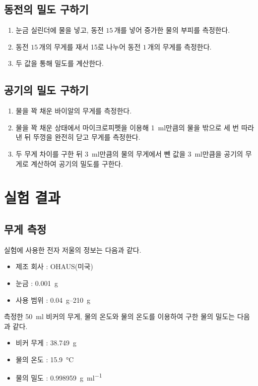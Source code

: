 \documentclass{GSHS-chemexp}
\begin{document}
	\subsection{동전의 밀도 구하기}
	\begin{enumerate}
		\item 눈금 실린더에 물을 넣고, 동전 $15\,\mbox{개}$를 넣어
		증가한 물의 부피를 측정한다.
		\item 동전 $15\,\mbox{개}$의 무게를 재서 15로 나누어
		동전 $1\,\mbox{개}$의 무게를 측정한다.
		\item 두 값을 통해 밀도를 계산한다.
	\end{enumerate}
	
	\subsection{공기의 밀도 구하기}
	\begin{enumerate}
		\item 물을 꽉 채운 바이알의 무게를 측정한다.
		\item 물을 꽉 채운 상태에서 마이크로피펫을 이용해
		\SI{1}{\milli\litre}만큼의 물을 밖으로 세 번 따라낸 뒤
		뚜껑을 완전히 닫고 무게를 측정한다.
		\item 두 무게 차이를 구한 뒤 \SI{3}{\milli\litre}만큼의 물의 무게에서
		뺀 값을 \SI{3}{\milli\litre}만큼을 공기의 무게로 계산하여
		공기의 밀도를 구한다.
	\end{enumerate}
	
	\section{실험 결과}
	
	\subsection{무게 측정}
	실험에 사용한 전자 저울의 정보는 다음과 같다.
	\begin{itemize}
		\item 제조 회사 : OHAUS(미국)
		\item 눈금 : \SI{0.001}{\gram}
		\item 사용 범위 : \SIrange{0.04}{210}{\gram}
	\end{itemize}
	
	측정한 \SI{50}{\milli\litre} 비커의 무게, 물의 온도와
	물의 온도를 이용하여 구한 물의 밀도는 다음과 같다.
	\begin{itemize}
		\item 비커 무게 : \SI{38.749}{\gram}
		\item 물의 온도 : \SI{15.9}{\degreeCelsius}
		\item 물의 밀도 : \SI{0.998959}{\gram\per\milli\litre} \cite{Santa_Cruz}
	\end{itemize}
\end{document}
